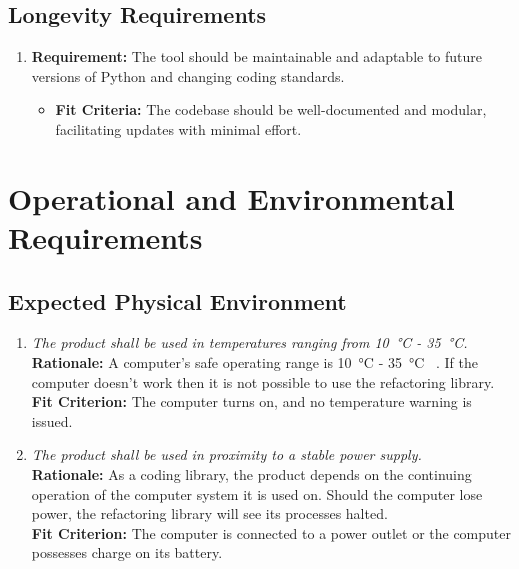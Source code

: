 \documentclass[12pt]{article}
\begin{document}
\subsection{Longevity Requirements}
\begin{enumerate}
  \item \textbf{Requirement:} The tool should be maintainable and adaptable to future versions of Python and changing coding standards.
  \begin{itemize}[label={}]
      \item \textbf{Fit Criteria:} The codebase should be well-documented and modular, facilitating updates with minimal effort.
  \end{itemize}
\end{enumerate}

\section{Operational and Environmental Requirements}
\subsection{Expected Physical Environment}

\begin{enumerate}[label=OER-EP \arabic*., wide=0pt, leftmargin=*]
	\item \emph{The product shall be used in temperatures ranging from \SI{10}{\celsius} - \SI{35}{\celsius}.}\\
    {\bf Rationale:} A computer's safe operating range is \SI{10}{\celsius} - \SI{35}{\celsius} ~\citep{PCTemp}. If the computer doesn't work then it is not possible to use the refactoring library. \\
    {\bf Fit Criterion:} The computer turns on, and no temperature warning is issued.
  \item \emph{The product shall be used in proximity to a stable power supply.}\\
  {\bf Rationale:} As a coding library, the product depends on the continuing operation of the computer system it is used on. Should the computer lose power, the refactoring library will see its processes halted. \\
  {\bf Fit Criterion:} The computer is connected to a power outlet or the computer possesses charge on its battery. 
\end{enumerate}
\end{document}
